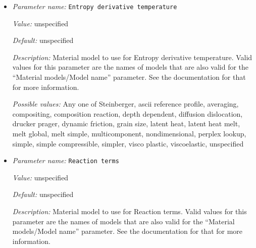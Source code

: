 \begin{itemize}
{\it Value:} unspecified


{\it Default:} unspecified


{\it Description:} Material model to use for Entropy derivative pressure. Valid values for this parameter are the names of models that are also valid for the ``Material models/Model name'' parameter. See the documentation for that for more information.


{\it Possible values:} Any one of Steinberger, ascii reference profile, averaging, compositing, composition reaction, depth dependent, diffusion dislocation, drucker prager, dynamic friction, grain size, latent heat, latent heat melt, melt global, melt simple, multicomponent, nondimensional, perplex lookup, simple, simple compressible, simpler, visco plastic, viscoelastic, unspecified
\item {\it Parameter name:} {\tt Entropy derivative temperature}
\label{parameters:Material model/Compositing/Entropy derivative temperature}


{\it Value:} unspecified


{\it Default:} unspecified


{\it Description:} Material model to use for Entropy derivative temperature. Valid values for this parameter are the names of models that are also valid for the ``Material models/Model name'' parameter. See the documentation for that for more information.


{\it Possible values:} Any one of Steinberger, ascii reference profile, averaging, compositing, composition reaction, depth dependent, diffusion dislocation, drucker prager, dynamic friction, grain size, latent heat, latent heat melt, melt global, melt simple, multicomponent, nondimensional, perplex lookup, simple, simple compressible, simpler, visco plastic, viscoelastic, unspecified
\item {\it Parameter name:} {\tt Reaction terms}
\label{parameters:Material model/Compositing/Reaction terms}


{\it Value:} unspecified


{\it Default:} unspecified


{\it Description:} Material model to use for Reaction terms. Valid values for this parameter are the names of models that are also valid for the ``Material models/Model name'' parameter. See the documentation for that for more information.



\end{itemize}
